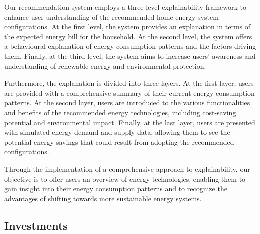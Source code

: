 Our recommendation system employs a three-level explainability framework to enhance user understanding of the recommended home energy system configurations. 
At the first level, the system provides an explanation in terms of the expected energy bill for the household. 
At the second level, the system offers a behavioural explanation of energy consumption patterns and the factors driving them. 
Finally, at the third level, the system aims to increase users' awareness and understanding of renewable energy and environmental protection.

Furthermore, the explanation is divided into three layers. 
At the first layer, users are provided with a comprehensive summary of their current energy consumption patterns. 
At the second layer, users are introduced to the various functionalities and benefits of the recommended energy technologies, including cost-saving potential and environmental impact. 
Finally, at the last layer, users are presented with simulated energy demand and supply data, allowing them to see the potential energy savings that could result from adopting the recommended configurations. 

Through the implementation of a comprehensive approach to explainability, our objective is to offer users an overview of energy technologies, enabling them to gain insight into their energy consumption patterns and to recognize the advantages of shifting towards more sustainable energy systems.


\subsection{Investments}

